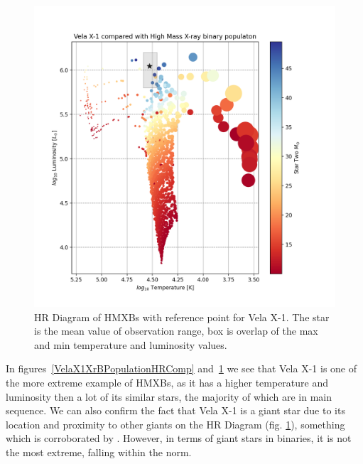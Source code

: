 \documentclass[12pt, a4paper]{article}
\begin{document}
            \begin{figure}[H] 
                \centering
                \includegraphics[scale = .5]{figs/GeneratedFigs/VelaX-1/VelaX1HMXBPopulationHRComp.png}
                \caption{HR Diagram of HMXBs with reference point for Vela X-1. The star is the mean value of observation range, box is overlap of the max and min temperature and luminosity values.}
                \label{VelaX1HMXBPopulationHRComp}
            \end{figure}


        In figures~\ref{VelaX1XrBPopulationHRComp} and~\ref{VelaX1HMXBPopulationHRComp} we see that Vela X-1 is one of the more extreme example of HMXBs, as it has a higher temperature and luminosity then a lot of its similar stars, the majority of which are in main sequence. We can also confirm the fact that Vela X-1 is a giant star due to its location and proximity to other giants on the HR Diagram (fig. \ref{VelaX1HMXBPopulationHRComp}), something which is corroborated by \cite{Kretschmar_2021}. However, in terms of giant stars in binaries, it is not the most extreme, falling within the norm.
    
\end{document}
